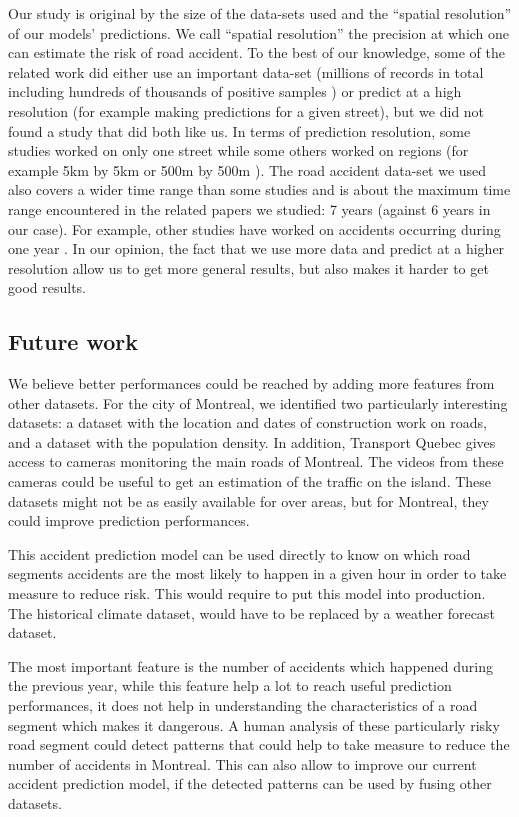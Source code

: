 \documentclass[conference]{IEEEtran}
\begin{document}
Our study is original by the size of the data-sets used and the ``spatial resolution'' of our models' predictions. We call ``spatial resolution'' the precision at which one can estimate the risk of road accident. To the best of our knowledge, some of the related work did either use an important data-set (millions of records in total including hundreds of thousands of positive samples \cite{QChen2016}) or predict at a high resolution (for example making predictions for a given street), but we did not found a study that did both like us. In terms of prediction resolution, some studies worked on only one street \cite{Chang2005} \cite{Chang2005b} \cite{Lin2015} while some others worked on regions (for example 5km by 5km \cite{QChen2016} or 500m by 500m \cite{Yuan2018}). The road accident data-set we used also covers a wider time range than some studies and is about the maximum time range encountered in the related papers we studied: 7 years \cite{Yuan2018} (against 6 years in our case). For example, other studies have worked on accidents occurring during one year \cite{Chang2005} \cite{Chang2005b} \cite{QChen2016} \cite{Lin2015}. In our opinion, the fact that we use more data and predict at a higher resolution allow us to get more general results, but also makes it harder to get good results. 

\subsection{Future work}

We believe better performances could be reached by adding more features
from other datasets. For the city of Montreal, we identified two
particularly interesting datasets: a dataset with the location and dates of
construction work on roads, and a dataset with the population density.
In addition, Transport Quebec gives access to cameras monitoring the main
roads of Montreal. The videos from these cameras could be useful to get an
estimation of the traffic on the island. These datasets might not be as
easily available for over areas, but for Montreal, they could improve 
prediction performances.

This accident prediction model
can be used directly to know on which road segments accidents are the most
likely to happen in a given hour in order to take measure to reduce risk.
This would require to put this model into production. The historical
climate dataset, would have to be replaced by a weather forecast dataset.

The most important feature is the number of accidents which happened during
the previous year, while this feature help a lot to reach useful prediction
performances, it does not help in understanding the characteristics of a
road segment which makes it dangerous. A human analysis of these
particularly risky road segment could detect patterns that could help to
take measure to reduce the number of accidents in Montreal. This can also
allow to improve our current accident prediction model, if the detected
patterns can be used by fusing other datasets.
\end{document}
